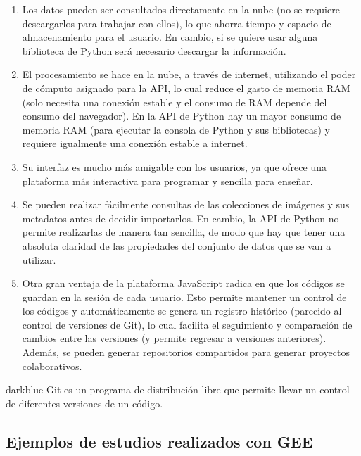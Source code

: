 \documentclass[
  12pt,
  letterpaper,
  twoside]{book}
\providecommand{\tightlist}{%
  \setlength{\itemsep}{0pt}\setlength{\parskip}{0pt}}
\begin{document}
\begin{enumerate}
\def\labelenumi{\arabic{enumi}.}
\tightlist
\item
  Los datos pueden ser consultados directamente en la nube (no se requiere descargarlos para trabajar con ellos), lo que ahorra tiempo y espacio de almacenamiento para el usuario. En cambio, si se quiere usar alguna biblioteca de Python será necesario descargar la información.
\item
  El procesamiento se hace en la nube, a través de internet, utilizando el poder de cómputo asignado para la API, lo cual reduce el gasto de memoria RAM (solo necesita una conexión estable y el consumo de RAM depende del consumo del navegador). En la API de Python hay un mayor consumo de memoria RAM (para ejecutar la consola de Python y sus bibliotecas) y requiere igualmente una conexión estable a internet.
\item
  Su interfaz es mucho más amigable con los usuarios, ya que ofrece una plataforma más interactiva para programar y sencilla para enseñar.
\item
  Se pueden realizar fácilmente consultas de las colecciones de imágenes y sus metadatos antes de decidir importarlos. En cambio, la API de Python no permite realizarlas de manera tan sencilla, de modo que hay que tener una absoluta claridad de las propiedades del conjunto de datos que se van a utilizar.
\item
  Otra gran ventaja de la plataforma JavaScript radica en que los códigos se guardan en la sesión de cada usuario. Esto permite mantener un control de los códigos y automáticamente se genera un registro histórico (parecido al control de versiones de Git), lo cual facilita el seguimiento y comparación de cambios entre las versiones (y permite regresar a versiones anteriores). Además, se pueden generar repositorios compartidos para generar proyectos colaborativos.
\end{enumerate}

\begin{bluebox2}

\begin{awesomeblock}{5pt}{\faLightbulb}{darkblue}
Git es un programa de distribución libre que permite llevar un control de diferentes versiones de un código.

\end{awesomeblock}

\end{bluebox2}

\hypertarget{ejemplos-de-estudios-realizados-con-gee}{%
\subsection*{Ejemplos de estudios realizados con GEE}\label{ejemplos-de-estudios-realizados-con-gee}}
\end{document}
